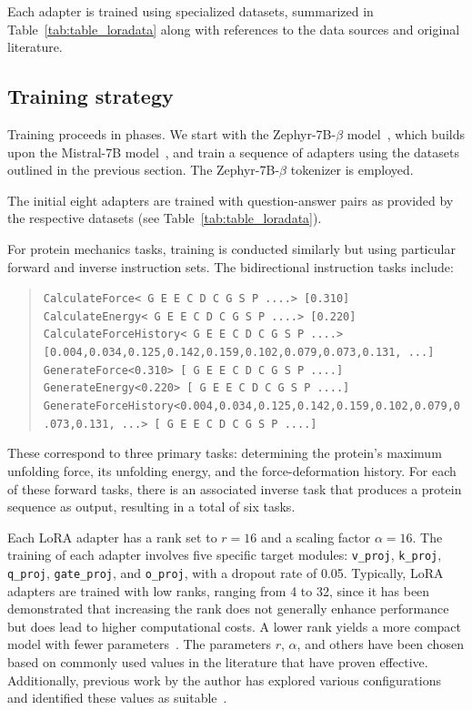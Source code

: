 Each adapter is trained using specialized datasets, summarized in Table~\ref{tab:table_loradata} along with references to the data sources and original literature.

\subsection{Training strategy} Training proceeds in phases. We start with the Zephyr-7B-$\beta$ model~\cite{HuggingFaceH4/zephyr-7b-betaFace}, which builds upon the Mistral-7B model~\cite{Jiang2023Mistral7B}, and train a sequence of adapters using the datasets outlined in the previous section. The Zephyr-7B-$\beta$ tokenizer is employed.

The initial eight adapters are trained with question-answer pairs as provided by the respective datasets (see Table~\ref{tab:table_loradata}).

For protein mechanics tasks, training is conducted similarly but using particular forward and inverse instruction sets. The bidirectional instruction tasks include:

\begin{quote}
\tiny {\texttt{CalculateForce< G E E C D C G S P ....> [0.310]\\
CalculateEnergy< G E E C D C G S P ....> [0.220]\\ 
CalculateForceHistory< G E E C D C G S P ....> [0.004,0.034,0.125,0.142,0.159,0.102,0.079,0.073,0.131, ...]\\
GenerateForce<0.310>\,[ G E E C D C G S P ....]\\
GenerateEnergy<0.220>\,[ G E E C D C G S P ....]\\
GenerateForceHistory<0.004,0.034,0.125,0.142,0.159,0.102,0.079,0.073,0.131, ...>\,[ G E E C D C G S P ....] }}
\end{quote}

These correspond to three primary tasks: determining the protein's maximum unfolding force, its unfolding energy, and the force-deformation history. For each of these forward tasks, there is an associated inverse task that produces a protein sequence as output, resulting in a total of six tasks.

Each LoRA adapter has a rank set to $r=16$ and a scaling factor $\alpha=16$. The training of each adapter involves five specific target modules: \texttt{v\_proj}, \texttt{k\_proj}, \texttt{q\_proj}, \texttt{gate\_proj}, and \texttt{o\_proj}, with a dropout rate of 0.05. Typically, LoRA adapters are trained with low ranks, ranging from 4 to 32, since it has been demonstrated that increasing the rank does not generally enhance performance but does lead to higher computational costs. A lower rank yields a more compact model with fewer parameters~\cite{hu2021lora}. The parameters $r$, $\alpha$, and others have been chosen based on commonly used values in the literature that have proven effective. Additionally, previous work by the author has explored various configurations and identified these values as suitable~\cite{Luu2023BioinspiredLLM:Materials}.

